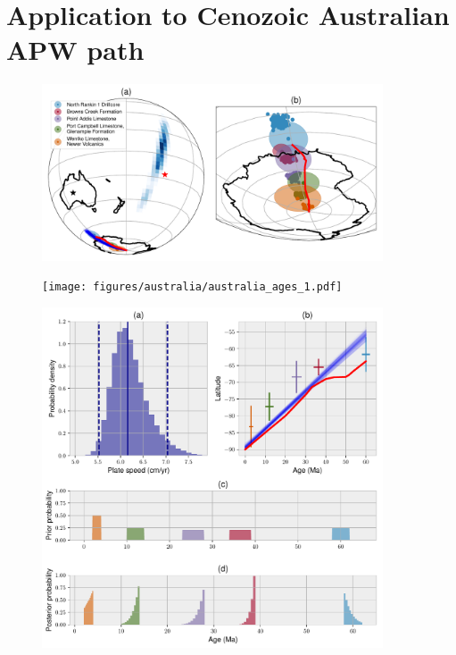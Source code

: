 \documentclass[preprint,12pt,authoryear]{elsarticle}
\begin{document}
\section{Application to Cenozoic Australian APW path}
\clearpage
\begin{figure}
\includegraphics[width=0.9\textwidth]{figures/australia/australia_paths_1.pdf}
\caption{}
\label{fig:australia_paths_1}
\end{figure}
\begin{figure}
\texttt{[image: figures/australia/australia\_ages\_1.pdf]}
\caption{}
\label{fig:australia_ages_1}
\end{figure}
\begin{figure}
\includegraphics[width=0.9\textwidth]{figures/australia/australia_speeds_1.pdf}
\caption{}
\label{fig:australia_speeds_1}
\end{figure}
\end{document}
